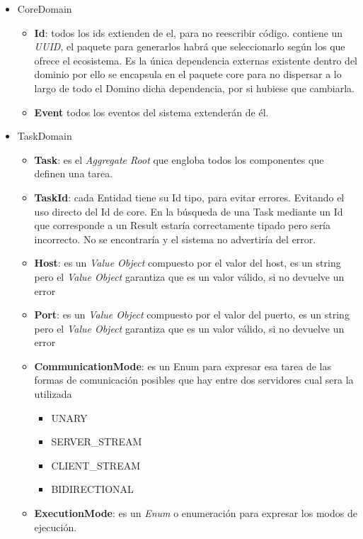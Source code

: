 \begin{itemize}
    \item CoreDomain
    \begin{itemize}
        \item \textbf{Id}: todos los ids extienden de el, para no reescribir código.
        contiene un \textit{UUID}, el paquete para generarlos habrá que seleccionarlo según los que ofrece el ecosistema.
        Es la única dependencia externas existente dentro del dominio por ello se encapsula en el  paquete core para no dispersar a lo largo de todo el Domino dicha dependencia, por si hubiese que cambiarla.
        \item \textbf{Event} todos los eventos del sistema extenderán de él.
    \end{itemize}
    \item TaskDomain
    \begin{itemize}
        \item \textbf{Task}: es el \textit{Aggregate Root} que engloba todos los componentes que definen una tarea.
        \item \textbf{TaskId}: cada Entidad tiene su Id tipo, para evitar errores.
        Evitando el uso directo del Id de core.
        En la búsqueda de una Task mediante un Id que corresponde a un Result estaría correctamente tipado pero sería incorrecto.
        No se encontraría y el sistema no advertiría del error.
        \item \textbf{Host}: es un \textit{Value Object} compuesto por el valor del host, es un string pero el \textit{Value Object} garantiza que es un valor válido, si no devuelve un error
        \item \textbf{Port}: es un \textit{Value Object} compuesto por el valor del puerto, es un string pero el \textit{Value Object} garantiza que es un valor válido, si no devuelve un error
        \item \textbf{CommunicationMode}: es un Enum para expresar esa tarea de las formas de comunicación posibles que hay entre dos servidores cual sera la utilizada
        \begin{itemize}
            \item UNARY
            \item SERVER\_STREAM
            \item CLIENT\_STREAM
            \item BIDIRECTIONAL
        \end{itemize}
        \item \textbf{ExecutionMode}: es un \textit{Enum} o enumeración para expresar los modos de ejecución.

\end{itemize}
\end{itemize}
